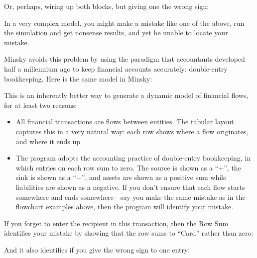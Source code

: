 \begin{center}
\end{center}

Or, perhaps, wiring up both blocks, but giving one the wrong sign:

\begin{center}
\end{center}

In a very complex model, you might make a mistake like one of the above, run the simulation and get nonsense results, and yet be unable to locate your mistake.


Minsky avoids this problem by using the paradigm that accountants
developed half a millennium ago to keep financial accounts accurately:
double-entry bookkeeping. Here is the same model in Minsky:

\begin{center}
\end{center}

This is an inherently better way to generate a dynamic model of financial flows, for at least two reasons:
\begin{itemize}
\item All financial transactions are flows between entities. The
  tabular layout captures this in a very natural way: each row shows
  where a flow originates, and where it ends up
\item The program adopts the accounting practice of double-entry
  bookkeeping, in which entries on each row sum to zero. The source is
  shown as a ``$+$'', the sink is shown as a ``$-$'', and assets are shown
  as a positive sum while liabilities are shown as a negative. If you
  don't ensure that each flow starts somewhere and ends
  somewhere---say you make the same mistake as in the flowchart
  examples above, then the program will identify your mistake.
\end{itemize}

If you forget to enter the recipient in this transaction, then the Row
Sum identifies your mistake by showing that the row sums to ``Card''
rather than zero:

\begin{center}
\end{center}

And it also identifies if you give the wrong sign to one entry:

\begin{center}
\end{center}


